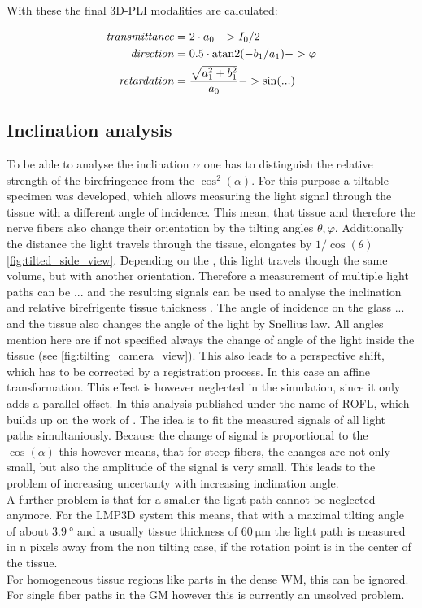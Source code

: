 With these the final \ac{3D-PLI} modalities are calculated:

\begin{align}
\begin{split}
\mathit{transmittance} &= 2 \cdot a_0 -> I_0/2\\
\mathit{direction} &= 0.5 \cdot \operatorname{atan2}(-b_1 / a_1) -> \varphi\\
\mathit{retardation} &= \frac{\sqrt{a_1^2 + b_1^2}}{a_0} -> \sin(...)
\end{split}
\end{align}
% 
% 
% 
% 
\subsection{Inclination analysis}
% 
To be able to analyse the inclination $\alpha$ one has to distinguish the relative strength of the birefringence from the $\cos^2(\alpha)$.
For this purpose a tiltable specimen was developed, which allows measuring the light signal through the tissue with a different angle of incidence.
This mean, that tissue and therefore the nerve fibers also change their orientation by the tilting angles $\theta, \varphi$.
Additionally the distance the light travels through the tissue, elongates by $1/\cos(\theta)$ \cref{fig:tilted_side_view}.
% 
Depending on the \pixelsize{}, this light travels though the same volume, but with another orientation.
Therefore a measurement of multiple light paths can be ... and the resulting signals can be used to analyse the inclination and relative birefrigente tissue thickness \trel{}.
The angle of incidence on the glass ... and the tissue also changes the angle of the light by Snellius law.
All angles mention here are if not specified always the change of angle of the light inside the tissue (see \cref{fig:tilting_camera_view}). 
This also leads to a perspective shift, which has to be corrected by a registration process.
In this case an affine transformation.
This effect is however neglected in the simulation, since it only adds a parallel offset.
% 
In \cite{Schmitz2018} this analysis published under the name of \ac{ROFL}, which builds up on the work of \cite{Wiese:887678}.
The idea is to fit the measured signals of all light paths simultaniously.
Because the change of signal is proportional to the $\cos(\alpha)$ this however means, that for steep fibers, the changes are not only small, but also the amplitude of the signal is very small.
This leads to the problem of increasing uncertanty with increasing inclination angle.
\\
A further problem is that for a smaller \pixelsize{} the light path cannot be neglected anymore.
For the \ac{LMP3D} system this means, that with a maximal tilting angle of about $\SI{3.9}{\degree}$ and a usually tissue thickness of $\SI{60}{\micro\meter}$ the light path is measured in n \dummy{} pixels away from the non tilting case, if the rotation point is in the center of the tissue.
\\
For homogeneous tissue regions like parts in the dense \ac{WM}, this can be ignored.
For single fiber paths in the \ac{GM} however this is currently an unsolved problem.
% 
% 
% 
